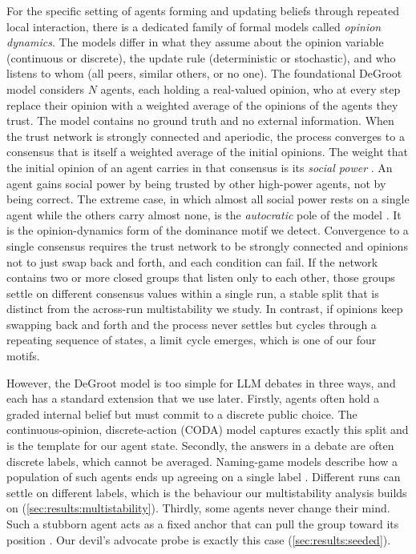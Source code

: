 For the specific setting of agents forming and updating beliefs through
repeated local interaction, there is a dedicated family of formal models called
\emph{opinion dynamics}. The models differ in what they assume about the
opinion variable (continuous or discrete), the update rule (deterministic or
stochastic), and who listens to whom (all peers, similar others, or no one).
The foundational DeGroot model \citep{degroot1974consensus} considers $N$
agents, each holding a real-valued opinion, who at every step replace their
opinion with a weighted average of the opinions of the agents they trust. The
model contains no ground truth and no external information. When the trust network is strongly connected and aperiodic, the process converges to a
consensus that is itself a weighted average of the initial opinions. The weight
that the initial opinion of an agent carries in that consensus is its \emph{social power}
\citep{jia2015opinion}. An agent gains social power by being trusted by other
high-power agents, not by being correct. The extreme case, in which almost all
social power rests on a single agent while the others carry almost none, is the
\emph{autocratic} pole of the model \citep{jia2015opinion}. It is the
opinion-dynamics form of the dominance motif we detect. Convergence to a single
consensus requires the trust network to be strongly connected and opinions
not to just swap back and forth, and each condition can fail. If the network contains two or more
closed groups that listen only to each other, those groups settle on different consensus values
within a single run, a stable split that is distinct from the across-run multistability we study.
In contrast, if opinions keep swapping back and forth and the process never settles but cycles
through a repeating sequence of states, a limit cycle emerges, which is one of our four motifs. 

However, the DeGroot model is too simple for \ac{LLM} debates in three ways, and each has a
standard extension that we use later. Firstly, agents often hold a graded
internal belief but must commit to a discrete public choice. The
continuous-opinion, discrete-action (CODA) model \citep{martins2008coda}
captures exactly this split and is the template for our agent state.
Secondly, the answers in a debate are often discrete labels,
which cannot be averaged. Naming-game models describe how a population of such
agents ends up agreeing on a single label \citep{baronchelli2018consensus}.
Different runs can settle on different labels, which is the behaviour our
multistability analysis builds on (\autoref{sec:results:multistability}).
Thirdly, some agents never change their mind. Such a stubborn agent acts as a
fixed anchor that can pull the group toward its position
\citep{friedkin1999social}. Our devil's advocate probe is exactly this case
(\autoref{sec:results:seeded}).

